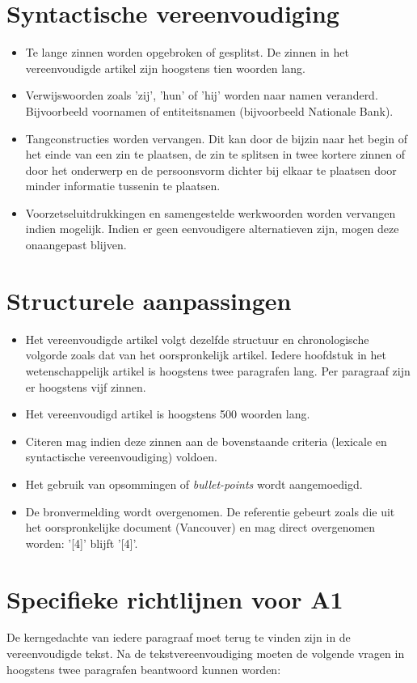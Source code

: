 	\section{Syntactische vereenvoudiging}
	
	\begin{itemize}
		\item Te lange zinnen worden opgebroken of gesplitst. De zinnen in het vereenvoudigde artikel zijn hoogstens tien woorden lang.
		\item Verwijswoorden zoals 'zij', 'hun' of 'hij' worden naar namen veranderd. Bijvoorbeeld voornamen of entiteitsnamen (bijvoorbeeld Nationale Bank). 
		\item Tangconstructies worden vervangen. Dit kan door de bijzin naar het begin of het einde van een zin te plaatsen, de zin te splitsen in twee kortere zinnen of door het onderwerp en de persoonsvorm dichter bij elkaar te plaatsen door minder informatie tussenin te plaatsen.
		\item Voorzetseluitdrukkingen en samengestelde werkwoorden worden vervangen indien mogelijk. Indien er geen eenvoudigere alternatieven zijn, mogen deze onaangepast blijven.
	\end{itemize}
	
	\section{Structurele aanpassingen}
	
	\begin{itemize}
		\item Het vereenvoudigde artikel volgt dezelfde structuur en chronologische volgorde zoals dat van het oorspronkelijk artikel. Iedere hoofdstuk in het wetenschappelijk artikel is hoogstens twee paragrafen lang. Per paragraaf zijn er hoogstens vijf zinnen.
		\item Het vereenvoudigd artikel is hoogstens 500 woorden lang. 
		\item Citeren mag indien deze zinnen aan de bovenstaande criteria (lexicale en syntactische vereenvoudiging) voldoen.
		\item Het gebruik van opsommingen of \textit{bullet-points} wordt aangemoedigd.
		\item De bronvermelding wordt overgenomen. De referentie gebeurt zoals die uit het oorspronkelijke document (Vancouver) en mag direct overgenomen worden: '[4]' blijft '[4]'.
	\end{itemize}
	
	
	\section{Specifieke richtlijnen voor A1}
De kerngedachte van iedere paragraaf moet terug te vinden zijn in de vereenvoudigde tekst. Na de tekstvereenvoudiging moeten de volgende vragen in hoogstens twee paragrafen beantwoord kunnen worden:
	
